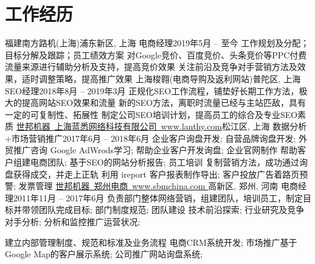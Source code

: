 \section{\textbf{工作经历}}
  \resumeSubHeadingListStart
    \resumeSubheading
      {福建南方路机(上海)}{浦东新区, 上海}
      {电商经理}{2019年5月 -- 至今}
      \resumeItemListStart
          {工作规划及分配；目标分解及跟踪；员工绩效方案}
          {对Google竞价、百度竞价、头条竞价等PPC付费流量来源进行辅助分析及支持，提高竞价效果}
          {关注前沿及竞争对手营销方法及效果，适时调整策略，提高推广效果}
      \resumeItemListEnd
    \resumeSubheading
      {上海梭翱(电商导购及返利网站)}{普陀区, 上海} %
      {SEO经理}{2018年8月 -- 2019年3月}
      \resumeItemListStart
          {正规化SEO工作流程，铺垫好长期工作方法，极大的提高网站SEO效果和流量}
          {新的SEO方法，离职时流量已经与主站匹敌，具有一定的可复制性、拓展性}
          {制定公司SEO培训计划，提高员工的综合及专业SEO素质}
      \resumeItemListEnd
    \resumeSubheading
      {\href{http://www.lanthy.com/}{世邦机器~上海蓝悉网络科技有限公司~www.lanthy.com}}{松江区, 上海}
      {数据分析+市场营销推广}{2017年6月 -- 2018年6月}
      \resumeItemListStart
          {企业客户询盘开发; 自营品牌询盘开发; 外贸推广咨询}
          {Google AdWrods学习; 帮助企业客户开发询盘; 企业官网制作}
          {帮助客户组建电商团队; 基于SEO的网站分析报告; 员工培训}
          {复制营销方法，成功通过询盘获得成交，并走上正轨}
          {利用 ireport 客户报表制作导出; 客户投放广告着路页预警; 发票管理}
      \resumeItemListEnd
    \resumeSubheading
      {\href{http://www.sbmchina.com/}{世邦机器~郑州电商~www.sbmchina.com }}{高新区, 郑州, 河南}
      {电商经理}{2011年11月 -- 2017年6月}
      \resumeItemListStart
          {负责部门整体网络营销，组建团队，培训员工，制定目标并带领团队完成目标; 部门制度规范; 团队建设}
          {技术前沿探索; 行业研究及竞争对手分析; 分析和监控推广运营状况;}

          {建立内部管理制度、规范和标准及业务流程}
          {电商CRM系统开发; 市场推广基于Google Map的客户展示系统; 公司推广网站询盘系统; }

